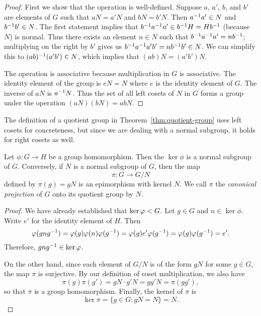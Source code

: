 \begin{proof}
    First we show that the operation is well-defined. Suppose \(a\), \(a'\),
    \(b\), and \(b'\) are elements of \(G\) such that \(aN = a'N\) and \(bN =
    b'N\). Then \(a^{-1} a' \in N\) and \(b^{-1} b' \in N\). The first statement
    implies that \(b^{-1} a^{-1} a' \in b^{-1} H = Hb^{-1}\) (because \(N\)) is
    normal. Thus there exists an element \(n \in N\) such that \(b^{-1} a^{-1} a'
    = nb^{-1}\); multiplying on the right by \(b'\) gives us \(b^{-1} a^{-1} a'b' =
    nb^{-1} b' \in N\). We can simplify this to \((ab)^{-1}(a'b') \in N\), which
    implies that \((ab)N = (a'b')N\).

    The operation is associative because multiplication in \(G\) is associative.
    The identity element of the group is \(eN = N\) where \(e\) is the identity
    element of \(G\). The inverse of \(aN\) is \(a^{-1} N\). Thus the set of all
    left cosets of \(N\) in \(G\) forms a group under the operation \((aN)(bN) =
    abN\).
\end{proof}

The definition of a quotient group in Theorem~\ref{thm:quotient-group} uses left
cosets for concreteness, but since we are dealing with a normal subgroup, it
holds for right cosets as well.

\begin{theorem}
    \label{thm:canonical-projection-grp}
    Let \(\phi : G \to H\) be a group homomorphism. Then the \(\ker \phi\) is a
    normal subgroup of \(G\). Conversely, if \(N\) is a normal subgroup of
    \(G\), then the map
    \[
        \pi : G \to G/N
    \]
    defined by \(\pi(g) = gN\) is an epimorphism with kernel \(N\). We call
    \(\pi\) the \emph{canonical projection} of \(G\) onto its quotient group by
    \(N\).
\end{theorem}

\begin{proof}
    We have already established that \(\ker \varphi < G\). Let \(g \in G\)
    and \(n \in \ker \phi\). Write \(e'\) for the identity element of \(H\).
    Then
    \[
        \varphi(gng^{-1}) = \varphi(g)\varphi(n)\varphi(g^{-1}) = \varphi(g)e'\varphi(g^{-1}) = \varphi(g)\varphi(g^{-1}) = e'.
    \]
    Therefore, \(gng^{-1} \in \ker \varphi\).

    On the other hand, since each element of \(G/N\) is of the form \(gN\) for
    some \(g \in G\), the map \(\pi\) is surjective. By our definition of coset
    multiplication, we also have
    \[
        \pi(g)\pi(g') = gN \cdot g'N = gg'N = \pi(gg'),
    \]
    so that \(\pi\) is a group homomorphism. Finally, the kernel of \(\pi\) is
    \[
        \ker \pi = \{g \in G : gN = N\} = N.
    \]
\end{proof}

